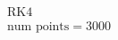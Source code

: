\documentclass[preview]{standalone}
\begin{document}
\begin{align*}
\text{RK4} \\ \text{num points} = 3000
\end{align*}
\end{document}
